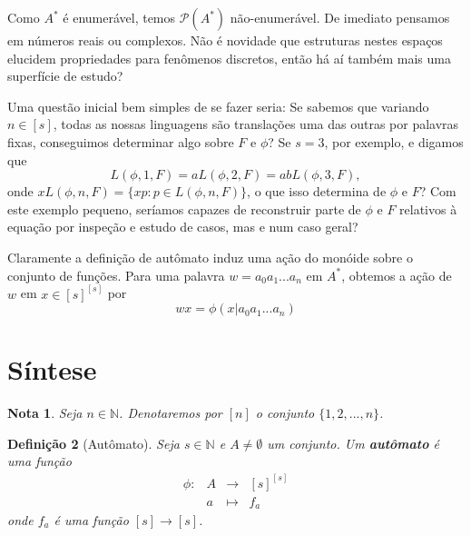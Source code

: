 \documentclass[11pt]{article}
\theoremstyle{plain}
\newtheorem{definicao}{Definição}[section]
\newtheorem{nota}[definicao]{Nota}
\theoremstyle{nonumberplain}
\newcommand{\naturais}{\mathbb{N}}
\newcommand{\set}[1]{\{#1\}}
\newcommand{\ainf}{A^*}
\newcommand{\funcset}[1]{#1^{#1}}
\newcommand{\powerset}[1]{\mathcal{P}(#1)}
\begin{document}
Como $\ainf$ é enumerável, temos $\powerset{\ainf}$ não-enumerável. De imediato pensamos em números reais ou complexos. Não é novidade que estruturas nestes espaços elucidem propriedades para fenômenos discretos, então há aí também mais uma superfície de estudo?

Uma questão inicial bem simples de se fazer seria: Se sabemos que variando $n \in [s]$, todas as nossas linguagens são translações uma das outras por palavras fixas, conseguimos determinar algo sobre $F$ e $\phi$? Se $s = 3$, por exemplo, e digamos que \begin{equation}
    L(\phi, 1, F) = aL(\phi, 2, F) = abL(\phi, 3, F),
\end{equation}
onde $xL(\phi, n, F) = \set { xp : p \in L(\phi, n, F)}$, o que isso determina de $\phi$ e $F$? Com este exemplo pequeno, seríamos capazes de reconstruir parte de $\phi$ e $F$ relativos à equação por inspeção e estudo de casos, mas e num caso geral?

Claramente a definição de autômato induz uma ação do monóide sobre o conjunto de funções. Para uma palavra $w = a_0a_1...a_n$ em $\ainf$, obtemos a ação de $w$ em $x \in \funcset{[s]}$ por \begin{equation}
    wx = \phi(x | a_0a_1...a_n)
\end{equation}

\section{Síntese}

\begin{nota} \label{nota:notacao_intervalo_discreto}
    Seja $n \in \naturais$. Denotaremos por $[n]$ o conjunto $\set{1, 2, ..., n}$.
\end{nota}

\begin{definicao}[Autômato] \label{def:automato}
    Seja $s \in \naturais$ e $A \neq \emptyset$ um conjunto. Um \textbf{autômato} é uma função \begin{equation}
        \begin{array}{cccc}
            \phi : & A & \to & \funcset{[s]} \\
            & a & \mapsto & f_a
        \end{array}
    \end{equation}
    onde $f_a$ é uma função $[s] \to [s]$.
\end{definicao}
\end{document}
